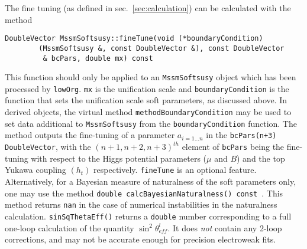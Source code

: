\documentclass{article}
\def\code#1{\small{\tt #1}\normalsize}
\begin{document}
The fine tuning (as defined in sec.~\ref{sec:calculation}) can be
calculated with the method 
\small
\begin{verbatim}
DoubleVector MssmSoftsusy::fineTune(void (*boundaryCondition)
        (MssmSoftsusy &, const DoubleVector &), const DoubleVector 
         & bcPars, double mx) const 
\end{verbatim}
\normalsize
This function should only be applied to an \code{MssmSoftsusy} object which
has been processed by \code{lowOrg}. \code{mx} is the unification scale and
\code{boundaryCondition} is the function that sets the unification scale soft
parameters, as discussed above. 
In derived objects, the virtual method
\code{methodBoundaryCondition} may be used to set data additional to
\code{MssmSoftsusy} from the \code{boundaryCondition} function. 
The method outputs the fine-tuning of a
parameter $a_{i=1\ldots n}$ in the \code{bcPars(n+3)} \code{DoubleVector}, 
with the $(n+1,n+2,n+3)^{th}$ element
of \code{bcPars} being the fine-tuning with respect to the Higgs potential
parameters ($\mu$ and $B$) and
the top Yukawa coupling
$(h_t)$ respectively. \code{fineTune} is an optional feature.
Alternatively, for a Bayesian measure of naturalness of the soft parameters only, one may use the method 
\code{double  calcBayesianNaturalness() const}~\cite{1709.07895}. This method
returns \code{nan} in the 
case of numerical instabilities in the naturalness calculation.
\code{sinSqThetaEff()} returns a \code{double} number corresponding to a full
one-loop calculation of the quantity $\sin^2 \theta_{eff}^l$. 
It does {\em
  not}\/ contain any 2-loop corrections, and may not be accurate enough for
precision electroweak fits. 
\end{document}
